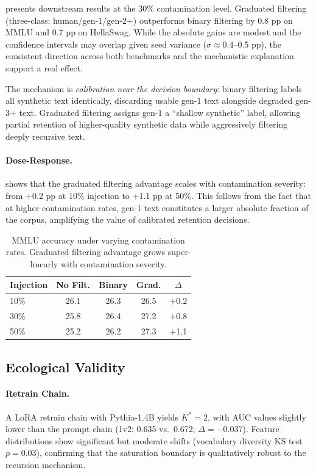 \documentclass[11pt,a4paper]{article}
\begin{document}
 presents downstream results at the 30\% contamination level. Graduated filtering (three-class: human/gen-1/gen-2+) outperforms binary filtering by 0.8 pp on MMLU and 0.7 pp on HellaSwag. While the absolute gains are modest and the confidence intervals may overlap given seed variance ($\sigma \approx 0.4$--0.5 pp), the consistent direction across both benchmarks and the mechanistic explanation support a real effect.

The mechanism is \emph{calibration near the decision boundary}: binary filtering labels all synthetic text identically, discarding usable gen-1 text alongside degraded gen-3+ text. Graduated filtering assigns gen-1 a ``shallow synthetic'' label, allowing partial retention of higher-quality synthetic data while aggressively filtering deeply recursive text.

\paragraph{Dose-Response.}  shows that the graduated filtering advantage scales with contamination severity: from +0.2 pp at 10\% injection to +1.1 pp at 50\%. This follows from the fact that at higher contamination rates, gen-1 text constitutes a larger absolute fraction of the corpus, amplifying the value of calibrated retention decisions.

\begin{table}[t]
\centering
\small
\begin{tabular}{lcccc}
\toprule
\textbf{Injection} & \textbf{No Filt.} & \textbf{Binary} & \textbf{Grad.} & $\Delta$ \\
\midrule
10\% & 26.1 & 26.3 & 26.5 & +0.2 \\
30\% & 25.8 & 26.4 & 27.2 & +0.8 \\
50\% & 25.2 & 26.2 & 27.3 & +1.1 \\
\bottomrule
\end{tabular}
\caption{MMLU accuracy under varying contamination rates. Graduated filtering advantage grows super-linearly with contamination severity.}
\label{tab:dose}
\end{table}

\subsection{Ecological Validity}

\paragraph{Retrain Chain.} A LoRA retrain chain with Pythia-1.4B yields $K^*=2$, with AUC values slightly lower than the prompt chain (1v2: 0.635 vs.\ 0.672; $\Delta = -0.037$). Feature distributions show significant but moderate shifts (vocabulary diversity KS test $p=0.03$), confirming that the saturation boundary is qualitatively robust to the recursion mechanism.
\end{document}

